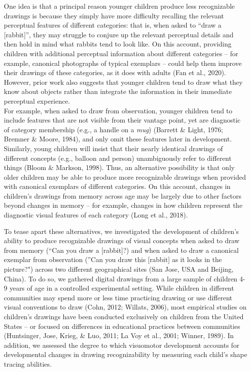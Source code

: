 \documentclass[
  english,
  man]{apa6}
\begin{document}
One idea is that a principal reason younger children produce less recognizable drawings is because they simply have more difficulty recalling the relevant perceptual features of different categories: that is, when asked to \enquote{draw a {[}rabbit{]}}, they may struggle to conjure up the relevant perceptual details and then hold in mind what rabbits tend to look like.
On this account, providing children with additional perceptual information about different categories -- for example, canonical photographs of typical exemplars -- could help them improve their drawings of these categories, as it does with adults (Fan et al., 2020).
However, prior work also suggests that younger children tend to draw what they know about objects rather than integrate the information in their immediate perceptual experience.\\
For example, when asked to draw from observation, younger children tend to include features that are not visible from their vantage point, yet are diagnostic of category membership (e.g., a handle on a \textit{mug}) (Barrett \& Light, 1976; Bremner \& Moore, 1984), and only omit these features later in development.
Similarly, young children will insist that their nearly identical drawings of different concepts (e.g., balloon and person) unambiguously refer to different things (Bloom \& Markson, 1998).
Thus, an alternative possibility is that only older children may be able to produce more recognizable drawings when provided with canonical exemplars of different categories.
On this account, changes in children's drawings from memory across age may be largely due to other factors beyond changes in memory -- for example, changes in how children represent the diagnostic visual features of each category (Long et al., 2018).

To tease apart these alternatives, we investigated the development of children's ability to produce recognizable drawings of visual concepts when asked to draw from memory (\enquote{Can you draw a {[}rabbit{]}?) and when asked to draw a canonical exemplar from observation (}Can you draw this {[}rabbit{]} as it looks in the picture?") across two different geographical sites (San Jose, USA and Beijing, China).
To do so, we gathered digital drawings from a large sample of children 4-9 years of age in a controlled experimental setting.
While children in different communities may spend more or less time practicing drawing or use different visual conventions to draw (Cohn, 2012; Willats, 2006), most empirical studies on children's drawings have been conducted exclusively on children from the United States -- or focused on differences in educational practices between communities (Huntsinger, Jose, Krieg, \& Luo, 2011; La Voy et al., 2001; Winner, 1989).
In addition, we assessed the degree to which visuomotor development accounts for developmental changes in drawing recognizability by measuring each child's shape tracing abilities.
\end{document}
